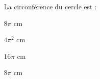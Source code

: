 \begin{QCM}
\begin{GroupeQCM}
\begin{exercice}
\begin{corrige}
\end{corrige}
\end{exercice}



\begin{exercice}\label{CDqcmB}
La circonférence du cercle est :

\begin{ChoixQCM}{4}
\item $8\pi$ cm
\item $4\pi^2$ cm
\item $16\pi$ cm
\item $8\pi$ cm
\end{ChoixQCM}

\begin{corrige}
\end{corrige}
\end{exercice}

\end{GroupeQCM}
\end{QCM}